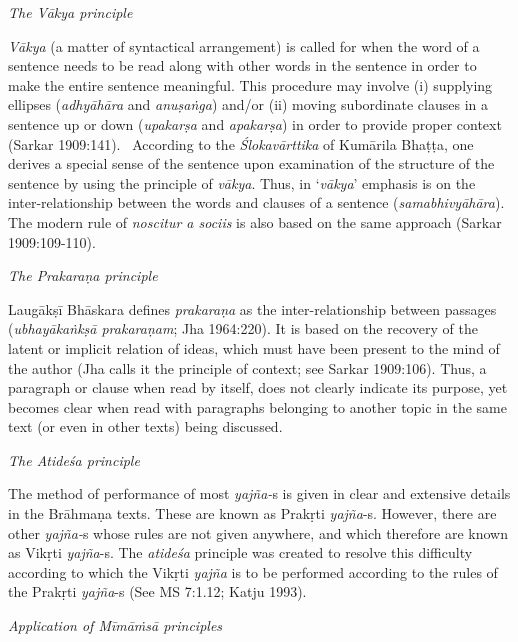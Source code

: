 \textit{The Vākya principle}

\textit{Vākya} (a matter of syntactical arrangement) is called for when the word of a sentence needs to be read along with other words in the sentence in order to make the entire sentence meaningful. This procedure may involve (i) supplying ellipses (\textit{adhyāhāra} and \textit{anuṣaṅga}) and/or (ii) moving subordinate clauses in a sentence up or down (\textit{upakarṣa} and \textit{apakarṣa}) in order to provide proper context (Sarkar 1909:141).  According to the \textit{Ślokavārttika} of Kumārila Bhaṭṭa, one derives a special sense of the sentence upon examination of the structure of the sentence by using the principle of \textit{vākya}. Thus, in ‘\textit{vākya}’ emphasis is on the inter-relationship between the words and clauses of a sentence (\textit{samabhivyāhāra}). The modern rule of \textit{noscitur a sociis} is also based on the same approach (Sarkar 1909:109-110).

\textit{The Prakaraṇa principle}

Laugākṣī Bhāskara defines \textit{prakaraṇa} as the inter-relationship between passages (\textit{ubhayākaṅkṣā prakaraṇam}; Jha 1964:220). It is based on the recovery of the latent or implicit relation of ideas, which must have been present to the mind of the author (Jha calls it the principle of context; see Sarkar 1909:106). Thus, a paragraph or clause when read by itself, does not clearly indicate its purpose, yet becomes clear when read with paragraphs belonging to another topic in the same text (or even in other texts) being discussed.

\textit{The Atideśa principle}

The method of performance of most \textit{yajña-}s is given in clear and extensive details in the Brāhmaṇa texts. These are known as Prakṛti \textit{yajña}-s. However, there are other \textit{yajña-}s whose rules are not given anywhere, and which therefore are known as Vikṛti \textit{yajña}-s. The \textit{atideśa} principle was created to resolve this difficulty according to which the Vikṛti \textit{yajña} is to be performed according to the rules of the Prakṛti \textit{yajña}-s (See MS 7:1.12; Katju 1993).

\textit{Application of Mīmāṁsā principles}

